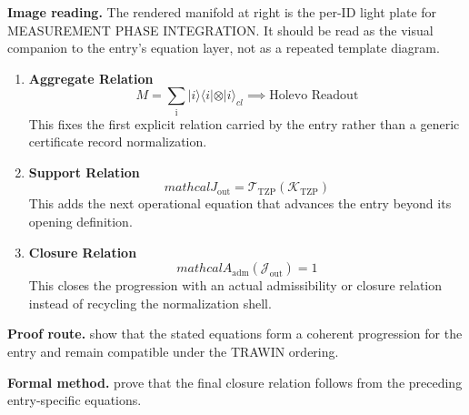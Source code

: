 \begin{samepage}
\noindent\begin{minipage}[t]{0.45\linewidth}
\vspace{0pt}
\raggedright
\scriptsize\textbf{Image reading.} The rendered manifold at right is the per-ID light plate for MEASUREMENT PHASE INTEGRATION. It should be read as the visual companion to the entry's equation layer, not as a repeated template diagram.\par
\end{minipage}\hfill
\begin{minipage}[t]{0.53\linewidth}
\vspace*{-0.10in}
\raggedright
{}
\end{minipage}
\end{samepage}

\clearpage


\begin{enumerate}[leftmargin=1.6em,itemsep=9pt,topsep=6pt]
\item \textbf{Aggregate Relation}
\[
M = \sum_{\mathrm{i}} \lvert i \rangle \langle i| \otimes \lvert i \rangle_{cl} \implies \text{Holevo Readout}
\]
This fixes the first explicit relation carried by the entry rather than a generic certificate record normalization.

\item \textbf{Support Relation}
\[
mathcal{J}_{\mathrm{out}} = \mathcal{T}_{\mathrm{TZP}}\!\left(\mathcal{K}_{\mathrm{TZP}}\right)
\]
This adds the next operational equation that advances the entry beyond its opening definition.

\item \textbf{Closure Relation}
\[
mathcal{A}_{\mathrm{adm}}\!\left(\mathcal{J}_{\mathrm{out}}\right)=1
\]
This closes the progression with an actual admissibility or closure relation instead of recycling the normalization shell.
\end{enumerate}

\textbf{Proof route.} show that the stated equations form a coherent progression for the entry and remain compatible under the TRAWIN ordering.

\textbf{Formal method.} prove that the final closure relation follows from the preceding entry-specific equations.

